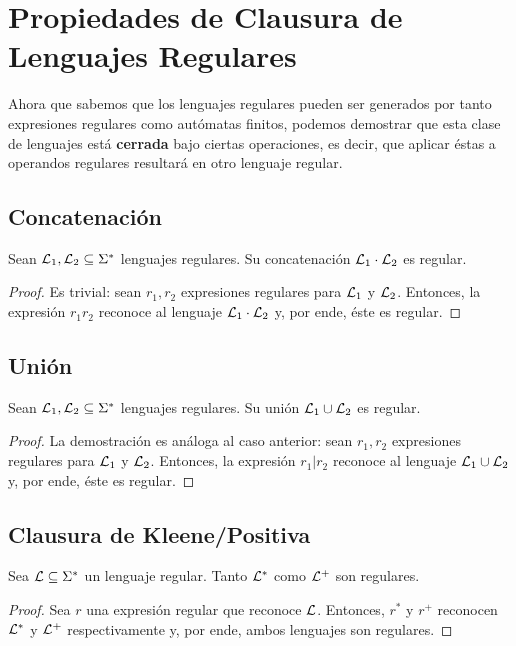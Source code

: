 \section{Propiedades de Clausura de Lenguajes Regulares}

Ahora que sabemos que los lenguajes regulares pueden ser generados por tanto expresiones regulares como autómatas finitos, podemos demostrar que esta clase de lenguajes está \textbf{cerrada} bajo ciertas operaciones, es decir, que aplicar éstas a operandos regulares resultará en otro lenguaje regular.

\subsection{Concatenación}

\begin{theorem*}
    Sean $\mathcal{L}_1, \mathcal{L}_2 \subseteq \Sigma^*$ lenguajes regulares. Su concatenación $\mathcal{L}_1 \cdot \mathcal{L}_2$ es regular.
\end{theorem*}
\begin{proof}
    Es trivial: sean $r_1, r_2$ expresiones regulares para $\mathcal{L}_1$ y $\mathcal{L}_2$. Entonces, la expresión $r_1 r_2$ reconoce al lenguaje $\mathcal{L}_1 \cdot \mathcal{L}_2$ y, por ende, éste es regular.
\end{proof}

\subsection{Unión}

\begin{theorem*}
    Sean $\mathcal{L}_1, \mathcal{L}_2 \subseteq \Sigma^*$ lenguajes regulares. Su unión $\mathcal{L}_1 \cup \mathcal{L}_2$ es regular.
\end{theorem*}
\begin{proof}
    La demostración es análoga al caso anterior: sean $r_1, r_2$ expresiones regulares para $\mathcal{L}_1$ y $\mathcal{L}_2$. Entonces, la expresión $r_1|r_2$ reconoce al lenguaje $\mathcal{L}_1 \cup \mathcal{L}_2$ y, por ende, éste es regular.
\end{proof}

\subsection{Clausura de Kleene/Positiva}

\begin{theorem*}
    Sea $\mathcal{L} \subseteq \Sigma^*$ un lenguaje regular. Tanto $\mathcal{L}^*$ como $\mathcal{L}^+$ son regulares.
\end{theorem*}
\begin{proof}
    Sea $r$ una expresión regular que reconoce $\mathcal{L}$. Entonces, $r^*$ y $r^+$ reconocen $\mathcal{L}^*$ y $\mathcal{L}^+$ respectivamente y, por ende, ambos lenguajes son regulares.
\end{proof}


